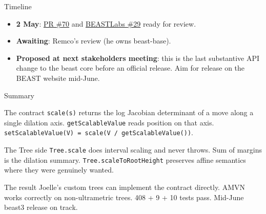 \documentclass[aspectratio=169,11pt]{beamer}
\newcommand{\code}[1]{\texttt{#1}}
\begin{document}
\begin{frame}{Timeline}
\begin{itemize}
\item \textbf{2 May}: \href{https://github.com/CompEvol/beast3/pull/70}{PR \#70} and \href{https://github.com/BEAST2-Dev/BEASTLabs/pull/29}{BEASTLabs \#29} ready for review.
\item \textbf{Awaiting}: Remco's review (he owns beast-base).
\item \textbf{Proposed at next stakeholders meeting}: this is the last substantive API change to the beast core before an official release.
Aim for release on the BEAST website mid-June.
\end{itemize}
\end{frame}

\begin{frame}{Summary}
\begin{block}{The contract}
\code{scale(s)} returns the log Jacobian determinant of a move along a single dilation axis.
\code{getScalableValue} reads position on that axis.
\code{setScalableValue(V) = scale(V / getScalableValue())}.
\end{block}

\vspace{0.5em}

\begin{block}{The Tree side}
\code{Tree.scale} does interval scaling and never throws.
Sum of margins is the dilation summary.
\code{Tree.scaleToRootHeight} preserves affine semantics where they were genuinely wanted.
\end{block}

\vspace{0.5em}

\begin{block}{The result}
Joelle's custom trees can implement the contract directly.
AMVN works correctly on non-ultrametric trees.
408 + 9 + 10 tests pass.
Mid-June beast3 release on track.
\end{block}
\end{frame}
\end{document}
